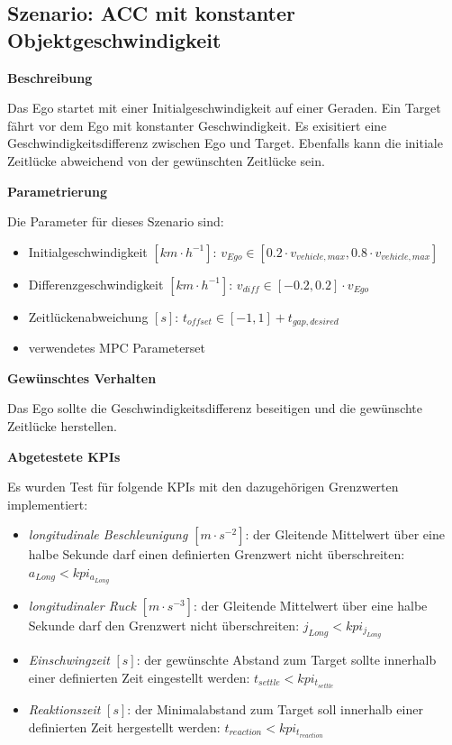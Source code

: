 \subsection{Szenario: ACC mit konstanter Objektgeschwindigkeit}
\textbf{Beschreibung}

\noindent Das Ego startet mit einer Initialgeschwindigkeit auf einer Geraden. Ein Target fährt vor dem Ego mit konstanter Geschwindigkeit. Es exisitiert eine Geschwindigkeitsdifferenz zwischen Ego und Target. Ebenfalls kann die initiale Zeitlücke abweichend von der gewünschten Zeitlücke sein.

\bigskip\noindent\textbf{Parametrierung}

\noindent Die Parameter für dieses Szenario sind:
\begin{itemize}
    \item Initialgeschwindigkeit $[km\cdot h^{-1}]$: $v_{Ego} \in [0.2\cdot v_{vehicle,max}, 0.8\cdot v_{vehicle,max}]$
    \item Differenzgeschwindigkeit $[km\cdot h^{-1}]$: $v_{diff} \in [-0.2,0.2]\cdot v_{Ego}$
    \item Zeitlückenabweichung $[s]$: $t_{offset} \in [-1,1] + t_{gap,desired}$
    \item verwendetes MPC Parameterset
\end{itemize}

\bigskip\noindent\textbf{Gewünschtes Verhalten}

\noindent Das Ego sollte die Geschwindigkeitsdifferenz beseitigen und die gewünschte Zeitlücke herstellen.

\bigskip\noindent\textbf{Abgetestete KPIs}

\noindent Es wurden Test für folgende KPIs mit den dazugehörigen Grenzwerten implementiert:
\begin{itemize}
    \item \textit{longitudinale Beschleunigung} $[m\cdot s^{-2}]$: der Gleitende Mittelwert über eine halbe Sekunde darf einen definierten Grenzwert nicht überschreiten: $a_{Long} < kpi_{a_{Long}}$
    \item \textit{longitudinaler Ruck} $[m\cdot s^{-3}]$: der Gleitende Mittelwert über eine halbe Sekunde darf den Grenzwert nicht überschreiten: $j_{Long} < kpi_{j_{Long}}$
    \item \textit{Einschwingzeit} $[s]$: der gewünschte Abstand zum Target sollte innerhalb einer definierten Zeit eingestellt werden: $t_{settle} < kpi_{t_{settle}}$
    \item \textit{Reaktionszeit} $[s]$: der Minimalabstand zum Target soll innerhalb einer definierten Zeit hergestellt werden: $t_{reaction} < kpi_{t_{reaction}}$
\end{itemize}

